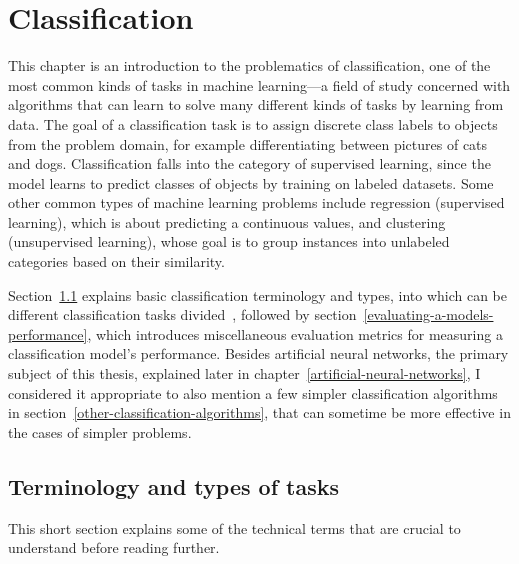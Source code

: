 \chapter{Classification}
\label{classification}
This chapter is an introduction to the problematics of classification, one of the most common kinds
of tasks in machine learning---a field of study concerned with algorithms that can learn to solve
many different kinds of tasks by learning from data. The goal of a classification
task is to assign discrete class labels to objects from the problem domain, for example
differentiating between pictures of cats and dogs. Classification falls into the category
of supervised learning, since the model learns to predict classes of objects
by training on labeled datasets.
Some other common types of machine learning problems include regression (supervised learning),
which is about predicting a continuous values, and clustering (unsupervised learning),
whose goal is to group instances into unlabeled categories based on their similarity.

Section~\ref{terminology-and-types-of-tasks} explains basic classification
terminology and types, into which can be different classification
tasks divided~\cite{classification-in-machine-learning}, followed by
section~\ref{evaluating-a-models-performance}, which introduces miscellaneous
evaluation metrics for measuring a classification model's performance.
Besides artificial neural networks,
the primary subject of this thesis, explained later in chapter~\ref{artificial-neural-networks},
I considered it appropriate to also mention a few simpler
classification algorithms~\cite{classification-algorithms} in
section~\ref{other-classification-algorithms},
that can sometime be more effective in the cases of simpler problems.





\section{Terminology and types of tasks}
\label{terminology-and-types-of-tasks}
This short section explains some of the technical terms that are crucial to understand before reading further.


